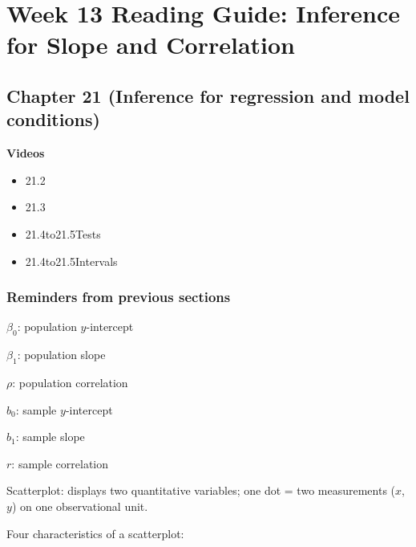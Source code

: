 \documentclass[
]{report}
\providecommand{\tightlist}{%
  \setlength{\itemsep}{0pt}\setlength{\parskip}{0pt}}
\begin{document}
\hypertarget{week-13-reading-guide-inference-for-slope-and-correlation}{%
\section{Week 13 Reading Guide: Inference for Slope and Correlation}\label{week-13-reading-guide-inference-for-slope-and-correlation}}

\hypertarget{chapter-21-inference-for-regression-and-model-conditions}{%
\subsection*{Chapter 21 (Inference for regression and model conditions)}\label{chapter-21-inference-for-regression-and-model-conditions}}

\textbf{Videos}

\begin{itemize}
\tightlist
\item
  21.2
\item
  21.3
\item
  21.4to21.5Tests
\item
  21.4to21.5Intervals
\end{itemize}


\hypertarget{reminders-from-previous-sections-11}{%
\subsubsection*{Reminders from previous sections}\label{reminders-from-previous-sections-11}}

\(\beta_0\): population \(y\)-intercept

\(\beta_1\): population slope

\(\rho\): population correlation

\(b_0\): sample \(y\)-intercept

\(b_1\): sample slope

\(r\): sample correlation

Scatterplot: displays two quantitative variables; one dot = two measurements (\(x\), \(y\)) on one observational unit.

Four characteristics of a scatterplot:
\end{document}
